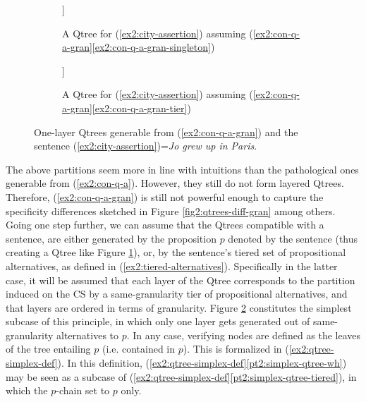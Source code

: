 \begin{figure}[H]
	\centering
	\begin{subfigure}[t]{.45\linewidth}
		\centering
		\begin{forest}
			[CS [\textcolor{orange}{Paris}] [\textcolor{orange}{$\neg${Paris}}]]
		\end{forest}
		\caption{A Qtree for (\ref{ex2:city-assertion}) assuming (\ref{ex2:con-q-a-gran}\ref{ex2:con-q-a-gran-singleton}) }\label{fig2:one-layer-polar}
	\end{subfigure}
	\hfill
	\begin{subfigure}[t]{.5\linewidth}
		\centering
		\begin{forest}
			[CS [\textcolor{orange}{Paris}] [\textcolor{orange}{Lyon}] [\textcolor{orange}{...}] [\textcolor{orange}{Berlin}] [\textcolor{orange}{...}] [\textcolor{orange}{Rome}]]
		\end{forest}
		\caption{A Qtree for (\ref{ex2:city-assertion}) assuming (\ref{ex2:con-q-a-gran}\ref{ex2:con-q-a-gran-tier})}\label{fig2:one-layer-wh}
	\end{subfigure}
	\caption{One-layer Qtrees generable from (\ref{ex2:con-q-a-gran}) and the sentence (\ref{ex2:city-assertion})=\textit{Jo grew up in Paris}.}\label{fig2:one-layer-qtrees}
\end{figure}

The above partitions seem more in line with intuitions than the pathological ones generable from (\ref{ex2:con-q-a}). However, they still do not form layered Qtrees. Therefore, (\ref{ex2:con-q-a-gran}) is still not powerful enough to capture the specificity differences sketched in Figure \ref{fig2:qtrees-diff-gran} among others. Going one step further, we can assume that the Qtrees compatible with a sentence, are either generated by the proposition $p$ denoted by the sentence (thus creating a Qtree like Figure \ref{fig2:one-layer-polar}), or, by the sentence's tiered set of propositional alternatives, as defined in (\ref{ex2:tiered-alternatives}). Specifically in the latter case, it will be assumed that each layer of the Qtree corresponds to the partition induced on the CS by a same-granularity tier of propositional alternatives, and that layers are ordered in terms of granularity. Figure \ref{fig2:one-layer-wh} constitutes the simplest subcase of this principle, in which only one layer gets generated out of same-granularity alternatives to $p$. In any case, verifying nodes are defined as the leaves of the tree entailing $p$ (i.e. contained in $p$). This is formalized in (\ref{ex2:qtree-simplex-def}). In this definition, (\ref{ex2:qtree-simplex-def}\ref{pt2:simplex-qtree-wh}) may be seen as a subcase of (\ref{ex2:qtree-simplex-def}\ref{pt2:simplex-qtree-tiered}), in which the $p$-chain set to $p$ only.

